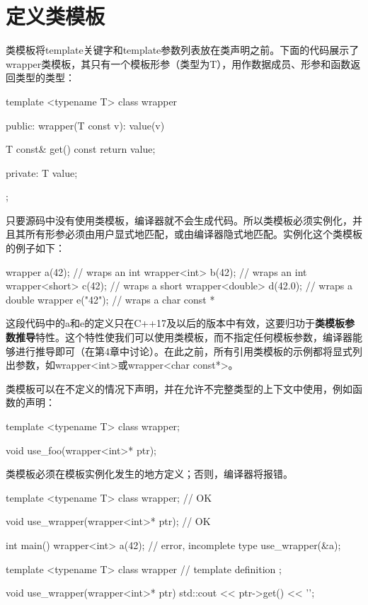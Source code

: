 \section{定义类模板}
类模板将template关键字和template参数列表放在类声明之前。下面的代码展示了wrapper类模板，其只有一个模板形参（类型为T），用作数据成员、形参和函数返回类型的类型：

\begin{cppcode}
template <typename T>
class wrapper
{
public:
	wrapper(T const v): value(v)
	{ }
	
	T const& get() const { return value; }
	
private:
	T value;
};
\end{cppcode}

只要源码中没有使用类模板，编译器就不会生成代码。所以类模板必须实例化，并且其所有形参必须由用户显式地匹配，或由编译器隐式地匹配。实例化这个类模板的例子如下：

\begin{cppcode}
wrapper a(42); // wraps an int
wrapper<int> b(42); // wraps an int
wrapper<short> c(42); // wraps a short
wrapper<double> d(42.0); // wraps a double
wrapper e("42"); // wraps a char const *
\end{cppcode}

这段代码中的a和e的定义只在C++17及以后的版本中有效，这要归功于\textbf{类模板参数推导}特性。这个特性使我们可以使用类模板，而不指定任何模板参数，编译器能够进行推导即可（在第4章中讨论）。在此之前，所有引用类模板的示例都将显式列出参数，如wrapper<int>或wrapper<char const*>。

类模板可以在不定义的情况下声明，并在允许不完整类型的上下文中使用，例如函数的声明：

\begin{cppcode}
template <typename T>
class wrapper;

void use_foo(wrapper<int>* ptr);
\end{cppcode}

类模板必须在模板实例化发生的地方定义；否则，编译器将报错。

\begin{cppcode}
template <typename T>
class wrapper; // OK

void use_wrapper(wrapper<int>* ptr); // OK

int main()
{
	wrapper<int> a(42); // error, incomplete type
	use_wrapper(&a);
}

template <typename T>
class wrapper
{
	// template definition
};

void use_wrapper(wrapper<int>* ptr)
{
	std::cout << ptr->get() << '\n';
}
\end{cppcode}


